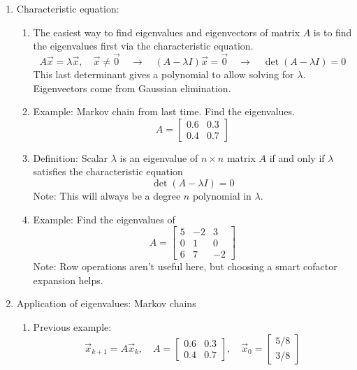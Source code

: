\documentclass{article}
\begin{document}
\begin{enumerate}

\item Characteristic equation:
\begin{enumerate}
\item The easiest way to find eigenvalues and eigenvectors of matrix $A$ is to find the eigenvalues first via the characteristic equation.
\[
A \vec{x} = \lambda \vec{x}, \quad \vec{x}\neq \vec{0} \quad \rightarrow \quad (A-\lambda I) \vec{x} = \vec{0} \quad \rightarrow \quad
\det(A-\lambda I) = 0
\]
This last determinant gives a polynomial to allow solving for $\lambda$. Eigenvectors come from Gaussian elimination.
\item Example: Markov chain from last time. Find the eigenvalues.
\[
A = \left[
\begin{array}{cc}
0.6 & 0.3 \\
0.4 & 0.7
\end{array}
\right]
\]
\item Definition: Scalar $\lambda$ is an eigenvalue of $n \times n$ matrix $A$ if and only if $\lambda$ satisfies the characteristic equation
\[
\det(A-\lambda I) = 0
\]
Note: This will always be a degree $n$ polynomial in $\lambda$.

\item Example: Find the eigenvalues of
\[
A = \left[
\begin{array}{ccc}
5 & -2 & 3 \\
0 & 1 &  0\\
6 & 7 & -2
\end{array}
\right]
\]
Note: Row operations aren't useful here, but choosing a smart cofactor expansion helps.
\end{enumerate}

\item Application of eigenvalues: Markov chains
\begin{enumerate}
\item Previous example:
\[
\vec{x}_{k+1} = A \vec{x}_k, \quad 
A =\left[
\begin{array}{cc}
0.6 & 0.3 \\
0.4 & 0.7
\end{array}
\right], \quad
\vec{x}_0 = \left[
\begin{array}{c}
5/8 \\
3/8
\end{array}
\right]
\]


\end{enumerate}
\end{enumerate}
\end{document}
